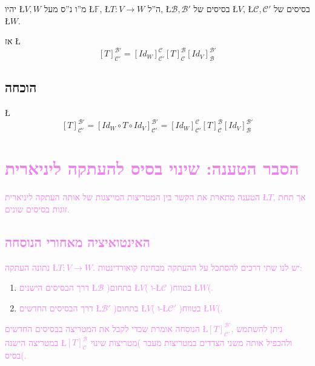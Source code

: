 \documentclass[english,hebrew]{article}
\begin{document}
יהיו \L{$V,W$} מ\textquotedblright ו נ\textquotedblright ס מעל \L{$\mathbb{F}$},
\L{$T:V\rightarrow W$} ה\textquotedblright ל, \L{$\mathcal{B},\mathcal{B}'$}
בסיסים של \L{$V$}, \L{$\mathcal{C},\mathcal{C}'$} בסיסים של \L{$W$}.

אז \L{%
\[
[T]_{\mathcal{C}'}^{\mathcal{B}'}=[Id_{W}]_{\mathcal{C}'}^{\mathcal{C}}[T]_{\mathcal{C}}^{\mathcal{B}}[Id_{V}]_{\mathcal{B}}^{\mathcal{B}'}
\]
}%
 

\subsection{הוכחה}

\L{%
\[
[T]_{\mathcal{C}'}^{\mathcal{B}'}=[Id_{W}\circ T\circ Id_{V}]_{\mathcal{C}'}^{\mathcal{B}'}=[Id_{W}]_{\mathcal{C}'}^{\mathcal{C}}[T]_{\mathcal{C}}^{\mathcal{B}}[Id_{V}]_{\mathcal{B}}^{\mathcal{B}'}
\]
}%

\section*{\textcolor{violet}{הסבר הטענה: שינוי בסיס להעתקה ליניארית}}

\textcolor{violet}{הטענה מתארת את הקשר בין המטריצות המייצגות של אותה
העתקה ליניארית \L{$T$}, אך תחת זוגות בסיסים שונים.}

\subsection*{\textcolor{violet}{האינטואיציה מאחורי הנוסחה}}

\textcolor{violet}{נתונה העתקה \L{$T:V\to W$}. יש לנו שתי דרכים להסתכל
על ההעתקה מבחינת קואורדינטות: }
\begin{enumerate}
\item \textcolor{violet}{דרך הבסיסים הישנים \L{$\mathcal{B}$} )בתחום \L{$V$}(
ו-\L{$\mathcal{C}$} )בטווח \L{$W$}(. }
\item \textcolor{violet}{דרך הבסיסים החדשים \L{$\mathcal{B}'$} )בתחום \L{$V$}(
ו-\L{$\mathcal{C}'$} )בטווח \L{$W$}(. }
\end{enumerate}
\textcolor{violet}{הנוסחה אומרת שכדי לקבל את המטריצה בבסיסים החדשים
\L{$[T]_{\mathcal{C}'}^{\mathcal{B}'}$}, ניתן להשתמש במטריצה הישנה
\L{$[T]_{\mathcal{C}}^{\mathcal{B}}$} ולהכפיל אותה משני הצדדים במטריצות
מעבר )מטריצות שינוי בסיס(.}
\end{document}
